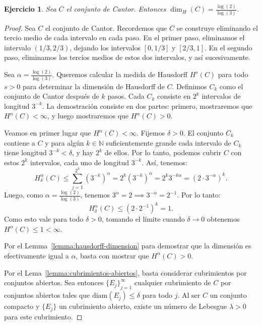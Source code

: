 \documentclass[12pt,a4paper]{article}
\theoremstyle{plain}
\newtheorem{ej}{Ejercicio}[section]
\theoremstyle{profesional}
\theoremstyle{definicion-style}
\newcommand{\N}{\mathbb{N}}
\begin{document}
\begin{ej}
	Sea \( C \) el conjunto de Cantor. Entonces \( \dim_H( C ) = \frac{\log(2)}{\log(3)} \).
\end{ej}
\begin{proof}
	Sea \( C \) el conjunto de Cantor. Recordemos que \( C \) se construye eliminando el tercio medio de cada intervalo en cada paso. En el primer paso, eliminamos el intervalo \( (1/3, 2/3) \), dejando los intervalos \( [0, 1/3] \) y \( [2/3, 1] \). En el segundo paso, eliminamos los tercios medios de estos dos intervalos, y así sucesivamente.

	Sea \( \alpha = \frac{\log(2)}{\log(3)} \). Queremos calcular la medida de Hausdorff \( H^s( C ) \) para todo \( s > 0 \) para determinar la dimensión de Hausdorff de \( C \). Definimos \( C_k \) como el conjunto de Cantor después de \( k \) pasos. Cada \( C_k \) consiste en \( 2^k \) intervalos de longitud \( 3^{-k} \). La demostración consiste en dos partes: primero, mostraremos que \( H^\alpha( C ) < \infty \), y luego mostraremos que \( H^\alpha( C ) > 0 \).

	Veamos en primer lugar que \( H^\alpha( C ) < \infty \). Fijemos \( \delta > 0 \). El conjunto \( C_k \) contiene a \( C \) y para algún \( k \in \N \) suficientemente grande cada intervalo de \( C_k \) tiene longitud \( 3^{-k} < \delta \), y hay \( 2^k \) de ellos. Por lo tanto, podemos cubrir \( C \) con estos \( 2^k \) intervalos, cada uno de longitud \( 3^{-k} \). Así, tenemos:
	\[
		H^\alpha_\delta( C ) \leq \sum_{j=1}^{2^k} {(3^{-k})}^\alpha = 2^k {(3^{-k})}^\alpha = 2^k 3^{-k\alpha} = {(2 \cdot 3^{-\alpha})}^k.
	\]
	Luego, como \( \alpha = \frac{\log(2)}{\log(3)} \), tenemos \( 3^\alpha = 2 \implies 3^{-\alpha} = 2^{-1} \). Por lo tanto:
	\[
		H^\alpha_\delta( C ) \leq {(2 \cdot 2^{-1})}^k = 1.
	\]
	Como esto vale para todo \( \delta > 0 \), tomando el límite cuando \( \delta \to 0 \) obtenemos \( H^\alpha( C ) \leq 1 < \infty \).

	Por el Lemma~\ref{lemma:hausdorff-dimension} para demostrar que la dimensión es efectivamente igual a \( \alpha \), basta con mostrar que \( H^\alpha( C ) > 0 \).


	Por el Lema~\ref{lemma:cubrimientos-abiertos}, basta considerar cubrimientos por conjuntos abiertos. Sea entonces \( {\{E_j\}}_{j=1}^\infty \) cualquier cubrimiento de \( C \) por conjuntos abiertos tales que \( \text{diam}(E_j) \le \delta \) para todo \( j \). Al ser \( C \) un conjunto compacto y \( \{E_j\} \) un cubrimiento abierto, existe un número de Lebesgue \( \lambda > 0 \) para este cubrimiento.


\end{proof}
\end{document}
